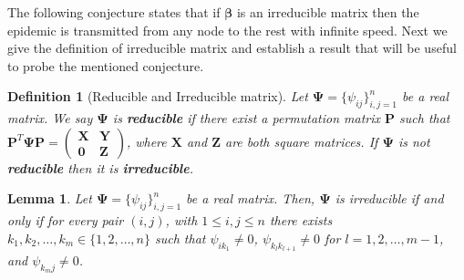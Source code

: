 \documentclass[a4paper,10pt]{article}
\newtheorem{lem}[thm]{Lemma}
\newtheorem{defn}[thm]{Definition}
\theoremstyle{remark}
\newcommand{\bm}[1]{\boldsymbol{#1}}
\begin{document}


The following conjecture states that if $\bm{\beta}$ is an irreducible matrix then the epidemic is transmitted from any node to the rest with infinite speed.
Next we give the definition of irreducible matrix and establish a result that will be useful to probe the mentioned conjecture. 

\begin{defn}[Reducible and Irreducible matrix]
Let $\bm{\Psi}=\{\psi_{ij}\}_{i,j=1}^n$ be a real matrix. We say $\bm{\Psi}$ is \textbf{reducible} if there exist a permutation matrix $\bm{P}$ such that $\bm{P}^{T}\bm{\Psi}\bm{P}=\left(\begin{array}{cc}
     \bm{X}  & \bm{Y}\\
     \bm{0} &  \bm{Z}
\end{array}\right)$, where $\bm{X}$ and $\bm{Z}$ are both square matrices. If $\bm{\Psi}$ is not \textbf{reducible} then it is \textbf{irreducible}.
\end{defn}

\begin{lem}\label{lema:Psi.irredusible<-->Grafofuert.conectado}
Let $\bm{\Psi}=\{\psi_{ij}\}_{i,j=1}^n$ be a real matrix. Then, $\bm{\Psi}$ is irreducible if and only if for every pair $(i,j)$, with $1\leq i,j\leq n$ there exists $k_1,k_2,\ldots,k_m\in \{1,2,\ldots,n\}$ such that $\psi_{ik_1}\neq 0$, $\psi_{k_lk_{l+1}}\neq 0$ for $l=1,2,\ldots,m-1$, and $\psi_{k_mj}\neq 0$.
\end{lem}


\end{document}
